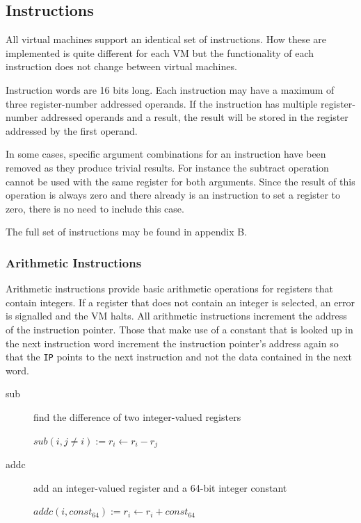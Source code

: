 \documentclass[english,a4paper]{article}
\begin{document}
\subsection{Instructions}

All virtual machines support an identical set of instructions. How
these are implemented is quite different for each VM but the
functionality of each instruction does not change between virtual
machines.

Instruction words are 16 bits long. Each instruction may have a
maximum of three register-number addressed operands. If the
instruction has multiple register-number addressed operands and a
result, the result will be stored in the register addressed by the
first operand.

In some cases, specific argument combinations for an instruction have
been removed as they produce trivial results. For instance the
subtract operation cannot be used with the same register for both
arguments. Since the result of this operation is always zero and there
already is an instruction to set a register to zero, there is no need
to include this case.

The full set of instructions may be found in appendix B.

\subsubsection{Arithmetic Instructions}

Arithmetic instructions provide basic arithmetic operations for registers that contain integers. If a register that does not contain
an integer is selected, an error is signalled and the VM halts. All
arithmetic instructions increment the address of the instruction pointer. Those that make use of a constant that is looked up in the next instruction word increment the instruction pointer's address again so that the \verb|IP| points to the next instruction and not the data contained in the next word.

\begin{description}
	\item[sub] find the difference of two integer-valued registers
	
	$sub(i, j\neq i) := r _{i} \longleftarrow  r _{i} - r _{j} $ \\	
	
	\item[addc] add an integer-valued register and a 64-bit integer
	constant
	
	$addc(i, const _{64}) := r _{i} \longleftarrow  r _{i} + const 
	_{64} $ \\
\end{description}
\end{document}
